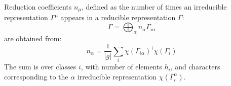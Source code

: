\documentclass[twocolumn,showpacs,preprintnumbers,superscriptaddress,prb,floatfix,aps,10pt]{revtex4-1}
\begin{document}
Reduction coefficients $n_\mu$, defined as the number of times an irreducible representation $\Gamma^\mu$ appears in a reducible representation $\Gamma$:
\begin{equation}
\label{eq:irrep_decomposition}
\Gamma = \bigoplus_\alpha n_\alpha \Gamma_{i\alpha}
\end{equation}
are obtained from:
\begin{equation}
\label{eq:irrep_decomposition_coefficients}
n_\alpha = \frac{1}{|g|} \sum_i \chi\left(\Gamma_{i\alpha}\right)^\dag \chi\left(\Gamma_i\right)
\end{equation}
The sum is over classes $i$, with number of elements $h_i$, and characters corresponding to the $\alpha$ irreducible representation $\chi(\Gamma_i^\alpha)$.





%
%
%
\end{document}
